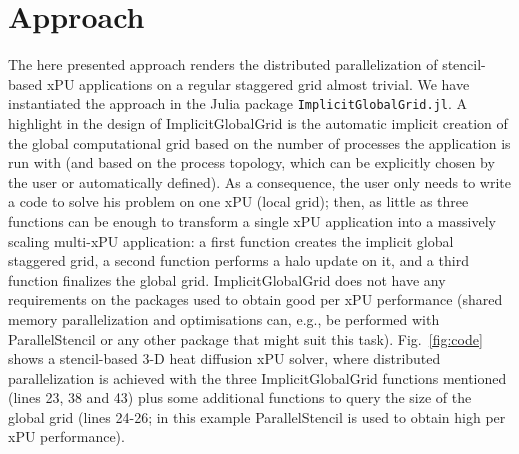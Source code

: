 \documentclass{juliacon}
\begin{document}
\section{Approach}
The here presented approach renders the distributed parallelization of stencil-based xPU applications on a regular staggered grid almost trivial. We have instantiated the approach in the Julia package \texttt{ImplicitGlobalGrid.jl}. A highlight in the design of ImplicitGlobalGrid is the automatic implicit creation of the global computational grid based on the number of processes the application is run with (and based on the process topology, which can be explicitly chosen by the user or automatically defined). As a consequence, the user only needs to write a code to solve his problem on one xPU (local grid); then, as little as three functions can be enough to transform a single xPU application into a massively scaling multi-xPU application: a first function creates the implicit global staggered grid, a second function performs a halo update on it, and a third function finalizes the global grid. ImplicitGlobalGrid does not have any requirements on the packages used to obtain good per xPU performance (shared memory parallelization and optimisations can, e.g., be performed with ParallelStencil \cite{parallelstencil2022} or any other package that might suit this task). Fig.~\ref{fig:code} shows a stencil-based 3-D heat diffusion xPU solver, where distributed parallelization is achieved with the three ImplicitGlobalGrid functions mentioned (lines 23, 38 and 43) plus some additional functions to query the size of the global grid (lines 24-26; in this example ParallelStencil \cite{parallelstencil2022} is used to obtain high per xPU performance).
\end{document}
